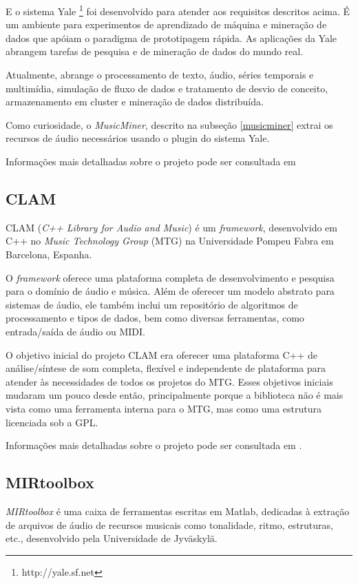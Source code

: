 E o sistema Yale \footnote{http://yale.sf.net} foi desenvolvido para atender aos requisitos descritos acima. É um ambiente para experimentos de aprendizado de máquina e mineração de dados que apóiam o paradigma de prototipagem rápida. As aplicações da Yale abrangem tarefas de pesquisa e de mineração de dados do mundo real.

Atualmente, abrange o processamento de texto, áudio, séries temporais e multimídia, simulação de fluxo de dados e tratamento de desvio de conceito, armazenamento em cluster e mineração de dados distribuída.

Como curiosidade, o \textit{MusicMiner}, descrito na subseção \ref{musicminer} extrai os recursos de áudio necessários usando o plugin do sistema Yale.

Informações mais detalhadas sobre o projeto pode ser consultada em \cite{mierswa2006}

\subsection{CLAM}
CLAM (\textit{C++ Library for Audio and Music}) é um \textit{framework}, desenvolvido em C++ no \textit{Music Technology Group} (MTG) na Universidade Pompeu Fabra em Barcelona, Espanha.

O \textit{framework} oferece uma plataforma completa de desenvolvimento e pesquisa para o domínio de áudio e música. Além de oferecer um modelo abstrato para sistemas de áudio, ele também inclui um repositório de algoritmos de processamento e tipos de dados, bem como diversas ferramentas, como entrada/saída de áudio ou MIDI.

O objetivo inicial do projeto CLAM era oferecer uma plataforma C++ de análise/síntese de som completa, flexível e independente de plataforma para atender às necessidades de todos os projetos do MTG. Esses objetivos iniciais mudaram um pouco desde então, principalmente porque a biblioteca não é mais vista como uma ferramenta interna para o MTG, mas como uma estrutura licenciada sob a GPL.

Informações mais detalhadas sobre o projeto pode ser consultada em \cite{amatriain2007}.

\subsection{MIRtoolbox}
\textit{MIRtoolbox} é uma caixa de ferramentas escritas em Matlab, dedicadas à extração de arquivos de áudio de recursos musicais como tonalidade, ritmo, estruturas, etc., desenvolvido pela Universidade de Jyväskylä.

